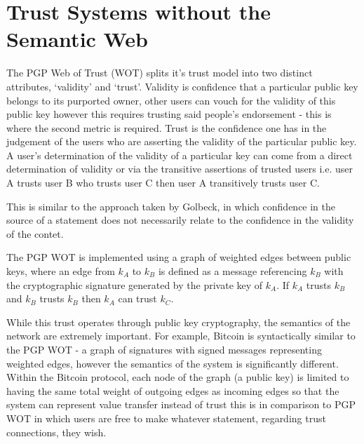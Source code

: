 \documentclass{acm_proc_article-sp}
\begin{document}
\section{Trust Systems without the Semantic Web}
The PGP Web of Trust (WOT)\cite{_how_pgp_1999} splits it's trust model into two distinct attributes, `validity' and `trust'.   Validity is confidence that a particular public key belongs to its purported owner, other users can vouch for the validity of this public key however this requires trusting said people's endorsement - this is where the second metric is required.  Trust is the confidence one has in the judgement of the users who are asserting the validity of the particular public key.  A user's determination of the validity of a particular key can come from a direct determination of validity or via the transitive assertions of trusted users i.e. user A trusts user B who trusts user C then user A transitively trusts user C.

This is similar to the approach taken by Golbeck, in which confidence in the source of a statement does not necessarily relate to the confidence in the validity of the contet.

The PGP WOT is implemented using a graph of weighted edges between public keys, where an edge from $k_A$ to $k_B$ is defined as a message referencing $k_B$ with the cryptographic signature generated by the private key of $k_A$. If $k_A$ trusts $k_B$ and $k_B$ trusts $k_B$ then $k_A$ can trust $k_C$.

While this trust operates through public key cryptography, the semantics of the network are extremely important. For example, Bitcoin is syntactically similar to the PGP WOT - a graph of signatures with signed messages representing weighted edges, however the semantics of the system is significantly different\cite{bitcoin}. Within the Bitcoin protocol, each node of the graph (a public key) is limited to having the same total weight of outgoing edges as incoming edges so that the system can represent value transfer instead of trust this is in comparison to PGP WOT in which users are free to make whatever statement, regarding trust connections, they wish.
\end{document}
